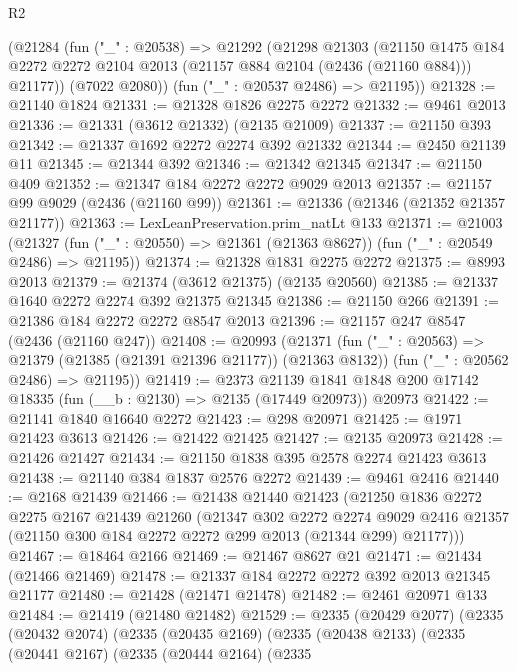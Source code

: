 \begin{lexlean}{R2}
\begin{coremodule}
    (@21284
      (fun ("_" : @20538) =>
      @21292
        (@21298
          @21303
          (@21150
            @1475
            @184
            @2272
            @2272
            @2104
            @2013
            (@21157 @884 @2104 (@2436 (@21160 @884)))
            @21177))
        (@7022 @2080))
      (fun ("_" : @20537 @2486) => @21195))
@21328 := @21140 @1824
@21331 := @21328 @1826 @2275 @2272
@21332 := @9461 @2013
@21336 := @21331 (@3612 @21332) (@2135 @21009)
@21337 := @21150 @393
@21342 := @21337 @1692 @2272 @2274 @392 @21332
@21344 := @2450 @21139 @11
@21345 := @21344 @392
@21346 := @21342 @21345
@21347 := @21150 @409
@21352 := @21347 @184 @2272 @2272 @9029 @2013
@21357 := @21157 @99 @9029 (@2436 (@21160 @99))
@21361 := @21336 (@21346 (@21352 @21357 @21177))
@21363 := LexLeanPreservation.prim_natLt @133
@21371 := @21003
    (@21327 (fun ("_" : @20550) => @21361 (@21363 @8627)) (fun ("_" : @20549 @2486) => @21195))
@21374 := @21328 @1831 @2275 @2272
@21375 := @8993 @2013
@21379 := @21374 (@3612 @21375) (@2135 @20560)
@21385 := @21337 @1640 @2272 @2274 @392 @21375 @21345
@21386 := @21150 @266
@21391 := @21386 @184 @2272 @2272 @8547 @2013
@21396 := @21157 @247 @8547 (@2436 (@21160 @247))
@21408 := @20993
    (@21371
      (fun ("_" : @20563) => @21379 (@21385 (@21391 @21396 @21177)) (@21363 @8132))
      (fun ("_" : @20562 @2486) => @21195))
@21419 := @2373
    @21139
    @1841
    @1848
    @200
    @17142
    @18335
    (fun (__b : @2130) => @2135 (@17449 @20973))
    @20973
@21422 := @21141 @1840 @16640 @2272
@21423 := @298 @20971
@21425 := @1971 @21423 @3613
@21426 := @21422 @21425
@21427 := @2135 @20973
@21428 := @21426 @21427
@21434 := @21150 @1838 @395 @2578 @2274 @21423 @3613
@21438 := @21140 @384 @1837 @2576 @2272
@21439 := @9461 @2416
@21440 := @2168 @21439
@21466 := @21438
    @21440
    @21423
    (@21250
      @1836
      @2272
      @2275
      @2167
      @21439
      @21260
      (@21347
        @302
        @2272
        @2274
        @9029
        @2416
        @21357
        (@21150 @300 @184 @2272 @2272 @299 @2013 (@21344 @299) @21177)))
@21467 := @18464 @2166
@21469 := @21467 @8627 @21
@21471 := @21434 (@21466 @21469)
@21478 := @21337 @184 @2272 @2272 @392 @2013 @21345 @21177
@21480 := @21428 (@21471 @21478)
@21482 := @2461 @20971 @133
@21484 := @21419 (@21480 @21482)
@21529 := @2335
    (@20429 @2077)
    (@2335
      (@20432 @2074)
      (@2335
        (@20435 @2169)
        (@2335
          (@20438 @2133)
          (@2335
            (@20441 @2167)
            (@2335
              (@20444 @2164)
              (@2335

\end{coremodule}
\end{lexlean}
